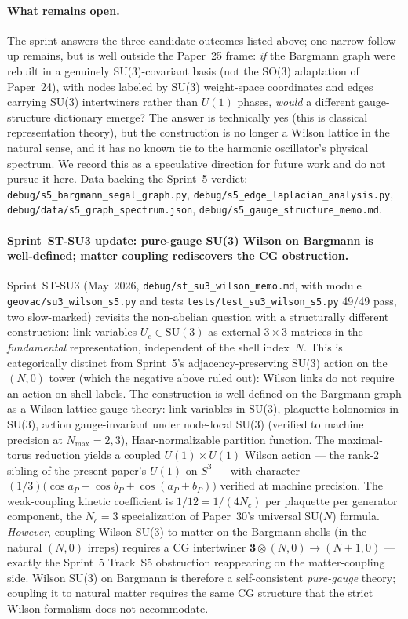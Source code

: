 \documentclass[aps,pra,twocolumn,superscriptaddress,longbibliography]{revtex4-2}
\begin{document}
\paragraph*{What remains open.} The sprint answers the three
candidate outcomes listed above; one narrow follow-up remains, but
is well outside the Paper~25 frame: \emph{if} the Bargmann graph
were rebuilt in a genuinely SU(3)-covariant basis (not the SO(3)
adaptation of Paper~24), with nodes labeled by SU(3) weight-space
coordinates and edges carrying SU(3) intertwiners rather than
$U(1)$ phases, \emph{would} a different gauge-structure dictionary
emerge?  The answer is technically yes (this is classical
representation theory), but the construction is no longer a Wilson
lattice in the natural sense, and it has no known tie to the
harmonic oscillator's physical spectrum.  We record this as a
speculative direction for future work and do not pursue it here.
Data backing the Sprint~5 verdict: \texttt{debug/s5\_bargmann\_segal\_graph.py},
\texttt{debug/s5\_edge\_laplacian\_analysis.py},
\texttt{debug/data/s5\_graph\_spectrum.json},
\texttt{debug/s5\_gauge\_structure\_memo.md}.

\paragraph*{Sprint~ST-SU3 update: pure-gauge SU(3) Wilson on
Bargmann is well-defined; matter coupling rediscovers the CG
obstruction.}  Sprint~ST-SU3 (May~2026,
\texttt{debug/st\_su3\_wilson\_memo.md}, with module
\texttt{geovac/su3\_wilson\_s5.py} and tests
\texttt{tests/test\_su3\_wilson\_s5.py} 49/49 pass, two slow-marked)
revisits the non-abelian question with a structurally different
construction: link variables $U_e \in \mathrm{SU}(3)$ as external
$3\times 3$ matrices in the \emph{fundamental} representation,
independent of the shell index~$N$.  This is categorically distinct
from Sprint~5's adjacency-preserving SU(3) action on the $(N, 0)$
tower (which the negative above ruled out): Wilson links do not
require an action on shell labels.  The construction is well-defined
on the Bargmann graph as a Wilson lattice gauge theory: link
variables in SU(3), plaquette holonomies in SU(3), action
gauge-invariant under node-local SU(3) (verified to machine
precision at $N_\text{max} = 2, 3$), Haar-normalizable partition
function.  The maximal-torus reduction yields a coupled
$U(1)\times U(1)$ Wilson action --- the rank-2 sibling of the present
paper's $U(1)$ on $S^3$ --- with character
$(1/3)\bigl(\cos a_P + \cos b_P + \cos(a_P + b_P)\bigr)$ verified at
machine precision.  The weak-coupling kinetic coefficient is
$1/12 = 1/(4 N_c)$ per plaquette per generator component, the
$N_c = 3$ specialization of Paper~30's universal SU($N$) formula.
\emph{However}, coupling Wilson SU(3) to matter on the Bargmann
shells (in the natural $(N, 0)$ irreps) requires a CG intertwiner
$\textbf{3} \otimes (N, 0) \to (N+1, 0)$ --- exactly the Sprint~5
Track~S5 obstruction reappearing on the matter-coupling side.
Wilson SU(3) on Bargmann is therefore a self-consistent
\emph{pure-gauge} theory; coupling it to natural matter requires the
same CG structure that the strict Wilson formalism does not
accommodate.
\end{document}
